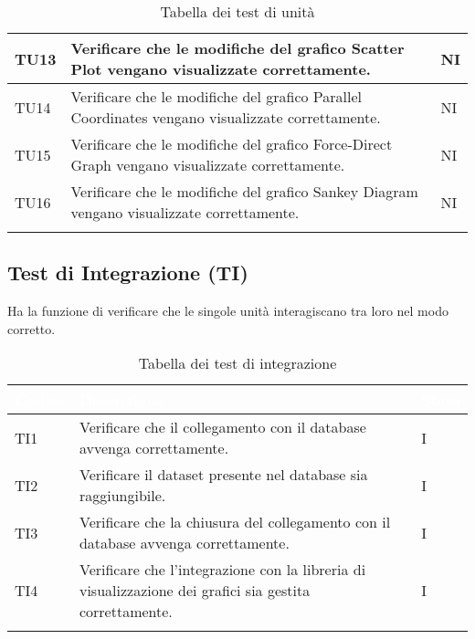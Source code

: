 \begin{center}
\begin{longtable}{|p{1.5cm}|p{11cm}|p{1cm}|}
            \rowcolor[HTML]{C0C0C0}
            TU13 & Verificare che le modifiche del grafico Scatter Plot vengano visualizzate correttamente. & NI\\ \hline
            \rowcolor[HTML]{EFEFEF}
            TU14 & Verificare che le modifiche del grafico Parallel Coordinates vengano visualizzate correttamente. & NI\\ \hline
            \rowcolor[HTML]{C0C0C0}
            TU15 & Verificare che le modifiche del grafico Force-Direct Graph vengano visualizzate correttamente. & NI\\ \hline
            \rowcolor[HTML]{EFEFEF}
            TU16 & Verificare che le modifiche del grafico Sankey Diagram vengano visualizzate correttamente. & NI\\ \hline
            \caption{Tabella dei test di unità}
        \end{longtable}
    \end{center}

    \subsection{Test di Integrazione (TI)} Ha la funzione di verificare che le singole unità interagiscano tra loro nel modo corretto.
    \begin{center}
        \renewcommand\arraystretch{1.5}
        \centering
        \begin{longtable}{|p{1.5cm}|p{11cm}|p{1cm}|}
        \hline
        \rowcolor[HTML]{036400}
        \textcolor{white}{\textbf{Codice}} & \textcolor{white}{\textbf{Descrizione}} & \textcolor{white}{\textbf{Stato}} \\ \hline
            \rowcolor[HTML]{EFEFEF}
            TI1 & Verificare che il collegamento con il database avvenga correttamente. & I\\ \hline
            \rowcolor[HTML]{C0C0C0}
            TI2 & Verificare il dataset presente nel database sia raggiungibile. & I\\ \hline
            \rowcolor[HTML]{EFEFEF}
            TI3 & Verificare che la chiusura del collegamento con il database avvenga correttamente. & I\\ \hline
            \rowcolor[HTML]{C0C0C0}
            TI4 & Verificare che l’integrazione con la libreria di visualizzazione dei grafici sia gestita correttamente. & I\\ \hline   
            \caption{Tabella dei test di integrazione}
        \end{longtable}
    \end{center}

